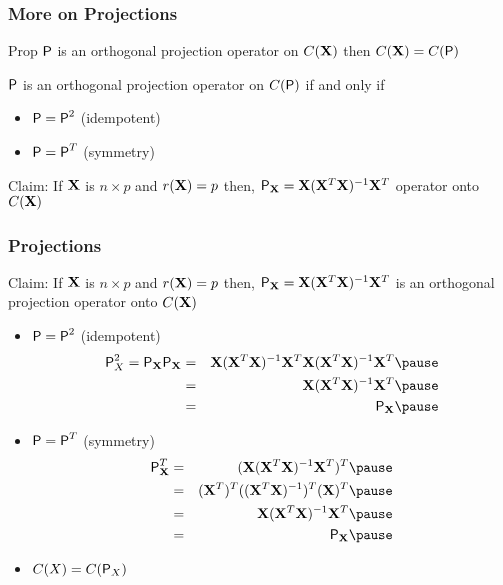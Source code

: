 \documentclass{beamer}
\begin{document}
\begin{frame} \frametitle{More on Projections}
\begin{block}{Prop}
   $\P$ is an orthogonal projection operator on $C(\X)$ then $C(\X) = C(\P)$
\end{block} \pause

\begin{theorem}
$\P$ is an orthogonal projection operator on $C(\P)$ if and
only if  \pause
\begin{itemize}
\item $\P = \P^2$  (idempotent)  \pause
\item $\P = \P^T$ (symmetry)   \pause
\end{itemize}
\end{theorem}
Claim:  If $\X$ is $n \times p$ and $r(\X) = p$ then, $\P_{\X} =
\X(\X^T\X)^{-1} \X^T$   operator  onto $C(\X)$
  
\end{frame}
\begin{frame} \frametitle{Projections}
Claim:  If $\X$ is $n \times p$ and $r(\X) = p$ then, $\P_{\X} =
\X(\X^T\X)^{-1} \X^T$  is an orthogonal projection operator  onto
$C(\X)$ \pause
 \begin{itemize}
\item $\P = \P^2$  (idempotent)  \pause
  \begin{eqnarray*}
 \P_X^2 = \P_\X \P_\X & = &\X(\X^T\X)^{-1} \X^T\X(\X^T\X)^{-1} \X^T   \pause \\
             & = & \X(\X^T\X)^{-1}\X^T \pause\\
 & = & \P_{\X} \pause
  \end{eqnarray*}

\item $\P = \P^T$ (symmetry)  \pause
 \begin{eqnarray*}
 \P_\X^T  & = & (\X(\X^T\X)^{-1}\X^T)^T \pause \\
             & = & (\X^T)^T((\X^T\X)^{-1})^T(\X)^T \pause \\
 & = &  \X(\X^T\X)^{-1}\X^T \pause \\
 & = & \P_{\X} \pause
  \end{eqnarray*}
\item $C(X) = C(\P_X)$  
\end{itemize}
\end{frame}
\end{document}
